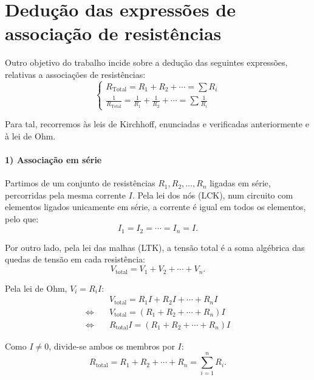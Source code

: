 \section{Dedução das expressões de associação de resistências}

Outro objetivo do trabalho incide sobre a dedução das seguintes expressões, relativas a associações de resistências:
\begin{equation*}
	\begin{cases}
		R_{\text{Total}} = R_1 + R_2 + \cdots = \sum R_i \\[6pt]
		\frac{1}{R_{\text{Total}}} = \frac{1}{R_1} + \frac{1}{R_2} + \cdots = \sum \frac{1}{R_i}
	\end{cases}
\end{equation*}
	
Para tal, recorremos às leis de Kirchhoff, enunciadas e verificadas anteriormente e à lei de Ohm.


\paragraph{1) Associação em série}

Partimos de um conjunto de resistências $R_1, R_2, \dots, R_n$ ligadas em série, percorridas pela mesma corrente $I$.
Pela lei dos nós (LCK), num circuito com elementos ligados unicamente em série, a corrente é igual em todos os elementos, pelo que:
\begin{equation*}
	I_1 = I_2 = \cdots = I_n = I.
\end{equation*}

Por outro lado, pela lei das malhas (LTK), a tensão total é a soma algébrica das quedas de tensão em cada resistência:
\begin{equation*}
	V_{\text{total}} = V_1 + V_2 + \cdots + V_n.
\end{equation*}

Pela lei de Ohm, $V_i = R_i I$:
\begin{align*}
	 & V_{\text{total}} = R_1 I + R_2 I + \cdots + R_n I \\\Leftrightarrow \quad &V_{\text{total}} = (R_1 + R_2 + \cdots + R_n) I
	\\\Leftrightarrow \quad &R_{\text{total}} I = (R_1 + R_2 + \cdots + R_n) I
\end{align*}

Como $I \neq 0$, divide-se ambos os membros por $I$:
\begin{equation*}
	R_{\text{total}} = R_1 + R_2 + \cdots + R_n = \sum_{i=1}^{n} R_i.
\end{equation*}

